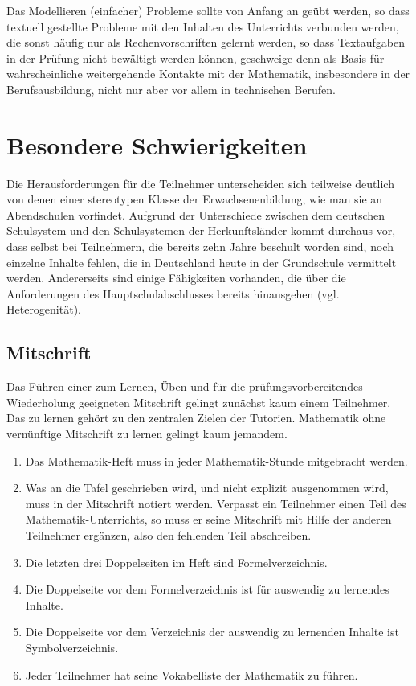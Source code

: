 \documentclass[a4paper]{book}%
\theoremstyle{definition}
\begin{document}
Das Modellieren (einfacher) Probleme sollte von Anfang an geübt werden, so dass textuell gestellte Probleme mit den Inhalten des Unterrichts verbunden werden, die sonst häufig nur als Rechenvorschriften gelernt werden, so dass Textaufgaben in der Prüfung nicht bewältigt werden können, geschweige denn als Basis für wahrscheinliche weitergehende Kontakte mit der Mathematik, insbesondere in der Berufsausbildung, nicht nur aber vor allem in technischen Berufen.


\section{Besondere Schwierigkeiten}

Die Herausforderungen für die Teilnehmer unterscheiden sich teilweise deutlich von denen einer stereotypen Klasse der Erwachsenenbildung, wie man sie an Abendschulen vorfindet. Aufgrund der Unterschiede zwischen dem deutschen Schulsystem und den Schulsystemen der Herkunftsländer kommt durchaus vor, dass selbst bei Teilnehmern, die bereits zehn Jahre beschult worden sind, noch einzelne Inhalte fehlen, die in Deutschland heute in der Grundschule vermittelt werden. Andererseits sind einige Fähigkeiten vorhanden, die über die Anforderungen des Hauptschulabschlusses bereits hinausgehen (vgl. Heterogenität).


\subsection{Mitschrift}

Das Führen einer zum Lernen, Üben und für die prüfungsvorbereitendes Wiederholung geeigneten Mitschrift gelingt zunächst kaum einem Teilnehmer. Das zu lernen gehört zu den zentralen Zielen der Tutorien. Mathematik ohne vernünftige Mitschrift zu lernen gelingt kaum jemandem.

\begin{enumerate}
  \item Das Mathematik-Heft muss in jeder Mathematik-Stunde mitgebracht werden.
  \item Was an die Tafel geschrieben wird, und nicht explizit ausgenommen wird, muss in der Mitschrift notiert werden. Verpasst ein Teilnehmer einen Teil des Mathematik-Unterrichts, so muss er seine Mitschrift mit Hilfe der anderen Teilnehmer ergänzen, also den fehlenden Teil abschreiben.
  \item Die letzten drei Doppelseiten im Heft sind Formelverzeichnis.
  \item Die Doppelseite vor dem Formelverzeichnis ist für auswendig zu lernendes Inhalte.
  \item Die Doppelseite vor dem Verzeichnis der auswendig zu lernenden Inhalte ist Symbolverzeichnis.
  \item Jeder Teilnehmer hat seine Vokabelliste der Mathematik zu führen.
\end{enumerate}
\end{document}
